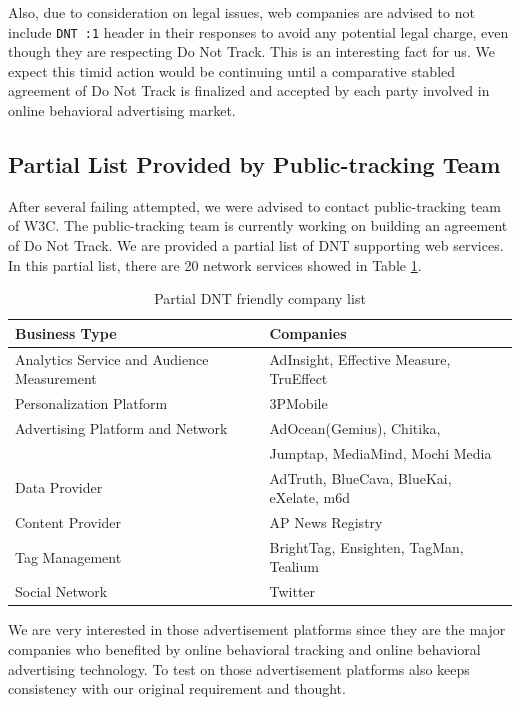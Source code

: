 \documentclass{sig-alternate}
\begin{document}
Also, due to consideration on legal issues, web companies are advised to not include \verb|DNT :1| header in their responses to avoid any potential legal charge, even though they are respecting Do Not Track. This is an interesting fact for us. We expect this timid action would be continuing until a comparative stabled agreement of Do Not Track is finalized and accepted by each party involved in online behavioral advertising market.

\subsection{Partial List Provided by Public-tracking Team}

After several failing attempted, we were advised to contact public-tracking team of W3C. The public-tracking team is currently working on building an agreement of Do Not Track. We are provided a partial list of DNT supporting web services. In this partial list, there are 20 network services showed in Table \ref{table:dntlist}.

\begin{table}
\footnotesize
\begin{tabular}{ll}
\toprule
Business Type&Companies\\
\midrule
\addlinespace
Analytics Service and Audience Measurement&AdInsight, Effective Measure, TruEffect\\ \hline
\addlinespace
Personalization Platform&3PMobile\\ \hline
\addlinespace
Advertising Platform and Network&AdOcean(Gemius), Chitika,\\& Jumptap, MediaMind, Mochi Media\\ \hline
\addlinespace
Data Provider&AdTruth, BlueCava, BlueKai, eXelate, m6d\\ \hline
\addlinespace
Content Provider&AP News Registry\\ \hline
\addlinespace
Tag Management&BrightTag, Ensighten, TagMan, Tealium\\ \hline
\addlinespace
Social Network&Twitter\\
\bottomrule
\end{tabular}
\caption{Partial DNT friendly company list}
\label{table:dntlist}
\end{table}

We are very interested in those advertisement platforms since they are the major companies who benefited by online behavioral tracking and online behavioral advertising technology. To test on those advertisement platforms also keeps consistency with our original requirement and thought.
\end{document}
